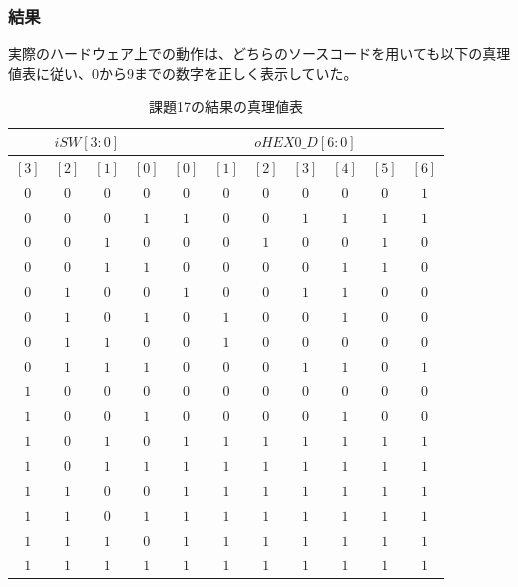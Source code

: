 \documentclass[a4paper]{jarticle}
\begin{document}
\subsubsection{結果}
実際のハードウェア上での動作は、どちらのソースコードを用いても以下の真理値表に従い、0から9までの数字を正しく表示していた。
\begin{table}[H]
	\begin{center}
		\caption{課題17の結果の真理値表}
		\label{Work17TruthTable}
		\begin{tabular}{|c|c|c|c||c|c|c|c|c|c|c|}
			\hline
			\multicolumn{4}{|c|}{$iSW \left[ 3:0 \right]$}							&\multicolumn{7}{|c|}{$oHEX0\_D \left[ 6:0 \right]$}															\\	\hline
			$\left[ 3 \right]$	&$\left[ 2 \right]$	&$\left[ 1 \right]$	&$\left[ 0 \right]$	&$\left[ 0 \right]$	&$\left[ 1 \right]$	&$\left[ 2 \right]$	&$\left[ 3 \right]$	&$\left[ 4 \right]$	&$\left[ 5 \right]$	&$\left[ 6 \right]$	\\	\hline\hline
			$0$			&$0$			&$0$			&$0$			&$0$			&$0$			&$0$			&$0$			&$0$			&$0$			&$1$			\\	\hline
			$0$			&$0$			&$0$			&$1$			&$1$			&$0$			&$0$			&$1$			&$1$			&$1$			&$1$			\\	\hline
			$0$			&$0$			&$1$			&$0$			&$0$			&$0$			&$1$			&$0$			&$0$			&$1$			&$0$			\\	\hline
			$0$			&$0$			&$1$			&$1$			&$0$			&$0$			&$0$			&$0$			&$1$			&$1$			&$0$			\\	\hline
			$0$			&$1$			&$0$			&$0$			&$1$			&$0$			&$0$			&$1$			&$1$			&$0$			&$0$			\\	\hline
			$0$			&$1$			&$0$			&$1$			&$0$			&$1$			&$0$			&$0$			&$1$			&$0$			&$0$			\\	\hline
			$0$			&$1$			&$1$			&$0$			&$0$			&$1$			&$0$			&$0$			&$0$			&$0$			&$0$			\\	\hline
			$0$			&$1$			&$1$			&$1$			&$0$			&$0$			&$0$			&$1$			&$1$			&$0$			&$1$			\\	\hline
			$1$			&$0$			&$0$			&$0$			&$0$			&$0$			&$0$			&$0$			&$0$			&$0$			&$0$			\\	\hline
			$1$			&$0$			&$0$			&$1$			&$0$			&$0$			&$0$			&$0$			&$1$			&$0$			&$0$			\\	\hline
			$1$			&$0$			&$1$			&$0$			&$1$			&$1$			&$1$			&$1$			&$1$			&$1$			&$1$			\\	\hline
			$1$			&$0$			&$1$			&$1$			&$1$			&$1$			&$1$			&$1$			&$1$			&$1$			&$1$			\\	\hline
			$1$			&$1$			&$0$			&$0$			&$1$			&$1$			&$1$			&$1$			&$1$			&$1$			&$1$			\\	\hline
			$1$			&$1$			&$0$			&$1$			&$1$			&$1$			&$1$			&$1$			&$1$			&$1$			&$1$			\\	\hline
			$1$			&$1$			&$1$			&$0$			&$1$			&$1$			&$1$			&$1$			&$1$			&$1$			&$1$			\\	\hline
			$1$			&$1$			&$1$			&$1$			&$1$			&$1$			&$1$			&$1$			&$1$			&$1$			&$1$			\\	\hline
		\end{tabular}
	\end{center}
\end{table}
\end{document}
